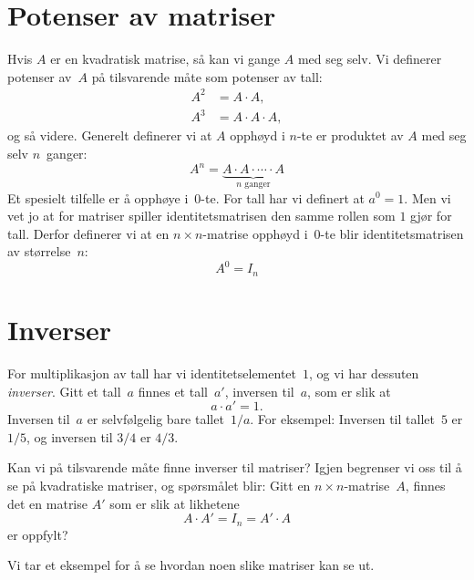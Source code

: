 \section*{Potenser av matriser}

Hvis $A$ er en kvadratisk matrise, så kan vi gange $A$ med seg selv.
Vi definerer potenser av~$A$ på tilsvarende måte som potenser av tall:
\begin{align*}
A^2 &= A \cdot A, \\
A^3 &= A \cdot A \cdot A,
\end{align*}
og så videre.  Generelt definerer vi at $A$ opphøyd i $n$-te er
produktet av $A$ med seg selv $n$~ganger:
\[
A^n = \underbrace{A \cdot A \cdot \cdots \cdot A}_{\text{$n$~ganger}}
\]
Et spesielt tilfelle er å opphøye i~$0$-te.  For tall har vi definert
at $a^0 = 1$.  Men vi vet jo at for matriser spiller
identitetsmatrisen den samme rollen som $1$ gjør for tall.  Derfor
definerer vi at en $n \times n$-matrise opphøyd i~$0$-te blir
identitetsmatrisen av størrelse~$n$:
\[
A^0 = I_n
\]


\section*{Inverser}

For multiplikasjon av tall har vi identitetselementet~$1$, og vi har
dessuten \emph{inverser}.  Gitt et tall~$a$ finnes et tall~$a'$,
inversen til~$a$, som er slik at
\[
a \cdot a' = 1.
\]
Inversen til~$a$ er selvfølgelig bare tallet~$1/a$.  For eksempel:
Inversen til tallet~$5$ er $1/5$, og inversen til $3/4$ er $4/3$.

Kan vi på tilsvarende måte finne inverser til matriser?  Igjen
begrenser vi oss til å se på kvadratiske matriser, og spørsmålet blir:
Gitt en $n \times n$-matrise~$A$, finnes det en matrise $A'$ som er
slik at likhetene
\[
A \cdot A' = I_n = A' \cdot A
\]
er oppfylt?

Vi tar et eksempel for å se hvordan noen slike matriser kan se ut.


